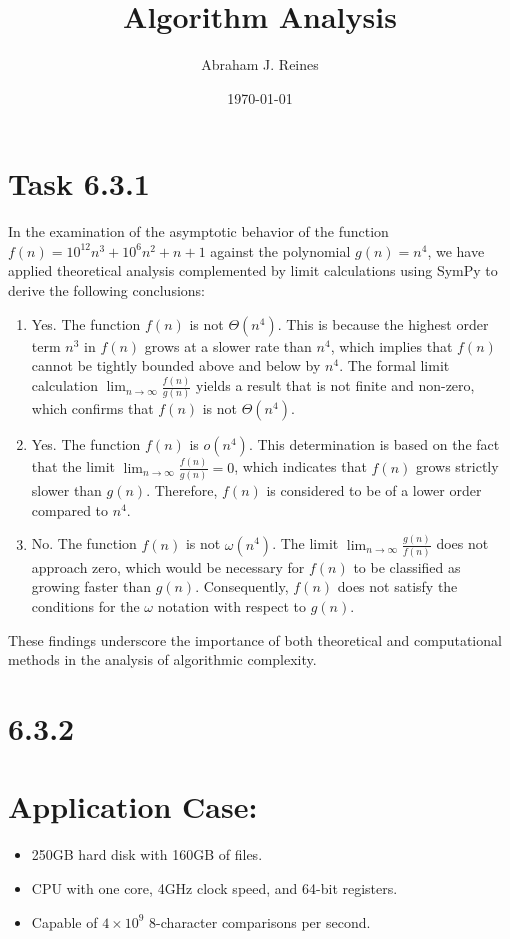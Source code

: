 \documentclass{article}
\title{Algorithm Analysis}
\author{Abraham J. Reines} %
\date{\today} %
\begin{document}
\maketitle

\section*{Task 6.3.1}

In the examination of the asymptotic behavior of the function $f(n) = 10^{12}n^3 + 10^6n^2 + n + 1$ against the polynomial $g(n) = n^4$, we have applied theoretical analysis complemented by limit calculations using SymPy to derive the following conclusions:

\begin{enumerate}
    \item Yes. The function $f(n)$ is not $\Theta(n^4)$. This is because the highest order term $n^3$ in $f(n)$ grows at a slower rate than $n^4$, which implies that $f(n)$ cannot be tightly bounded above and below by $n^4$. The formal limit calculation $\lim_{n \to \infty} \frac{f(n)}{g(n)}$ yields a result that is not finite and non-zero, which confirms that $f(n)$ is not $\Theta(n^4)$.
    
    \item Yes. The function $f(n)$ is $o(n^4)$. This determination is based on the fact that the limit $\lim_{n \to \infty} \frac{f(n)}{g(n)} = 0$, which indicates that $f(n)$ grows strictly slower than $g(n)$. Therefore, $f(n)$ is considered to be of a lower order compared to $n^4$.
    
    \item No. The function $f(n)$ is not $\omega(n^4)$. The limit $\lim_{n \to \infty} \frac{g(n)}{f(n)}$ does not approach zero, which would be necessary for $f(n)$ to be classified as growing faster than $g(n)$. Consequently, $f(n)$ does not satisfy the conditions for the $\omega$ notation with respect to $g(n)$.
\end{enumerate}

These findings underscore the importance of both theoretical and computational methods in the analysis of algorithmic complexity.


\section*{6.3.2}

\section*{Application Case:}
\begin{itemize}
    \item 250GB hard disk with 160GB of files.
    \item CPU with one core, 4GHz clock speed, and 64-bit registers.
    \item Capable of \(4 \times 10^9\) 8-character comparisons per second.
\end{itemize}
\end{document}
